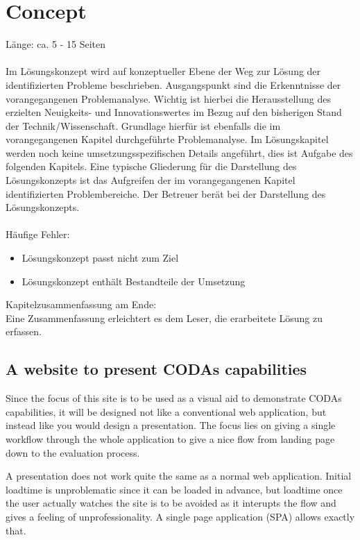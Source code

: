 \chapter{Concept}
Länge: ca. 5 - 15 Seiten\\\\
Im Lösungskonzept wird auf konzeptueller Ebene der Weg zur Lösung der identifizierten Probleme beschrieben. Ausgangspunkt sind die Erkenntnisse der vorangegangenen Problemanalyse. Wichtig ist hierbei die Herausstellung des erzielten Neuigkeits- und Innovationswertes im Bezug auf den bisherigen Stand der Technik/Wissenschaft. Grundlage hierfür ist ebenfalls die im vorangegangenen Kapitel durchgeführte Problemanalyse. Im Lösungskapitel werden noch keine umsetzungsspezifischen Details angeführt, dies ist Aufgabe des folgenden Kapitels. Eine typische Gliederung für die Darstellung des Lösungskonzepts ist das Aufgreifen der im vorangegangenen Kapitel identifizierten Problembereiche. Der Betreuer berät bei der Darstellung des Lösungskonzepts.\\\\

\noindent Häufige Fehler:
\begin{itemize}
	\item Lösungskonzept passt nicht zum Ziel
	\item Lösungskonzept enthält Bestandteile der Umsetzung
\end{itemize}

\noindent Kapitelzusammenfassung am Ende:\\
Eine Zusammenfassung erleichtert es dem Leser, die erarbeitete Lösung zu erfassen.

\section{A website to present CODAs capabilities}
Since the focus of this site is to be used as a visual aid to demonstrate CODAs capabilities, it will be designed not like a conventional web application, but instead like you would design a presentation. The focus lies on giving a single workflow through the whole application to give a nice flow from landing page down to the evaluation process.

A presentation does not work quite the same as a normal web application. Initial loadtime is unproblematic since it can be loaded in advance, but loadtime once the user actually watches the site is to be avoided as it interupts the flow and gives a feeling of unprofessionality. A single page application (SPA) allows exactly that.

